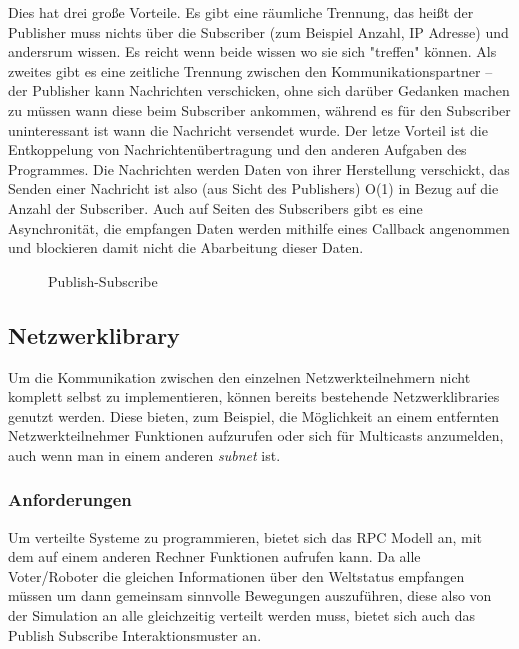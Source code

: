 Dies hat drei gro{\ss}e Vorteile. Es gibt eine r{\"{a}}umliche Trennung, das hei{\ss}t der Publisher muss
nichts {\"{u}}ber die Subscriber (zum Beispiel Anzahl, IP Adresse) und andersrum wissen. Es reicht
wenn beide wissen wo sie sich "treffen" k{\"{o}}nnen. Als zweites gibt es eine zeitliche Trennung zwischen
den Kommunikationspartner -- der Publisher kann Nachrichten verschicken, ohne sich dar{\"{u}}ber Gedanken
machen zu m{\"{u}}ssen wann diese beim Subscriber ankommen, w{\"{a}}hrend es f{\"{u}}r den Subscriber
uninteressant ist wann die Nachricht versendet wurde. Der letze Vorteil ist die Entkoppelung von
Nachrichten{\"{u}}bertragung und den anderen Aufgaben des Programmes. Die Nachrichten werden Daten
von ihrer Herstellung verschickt, das Senden einer Nachricht ist also (aus Sicht des
Publishers) O(1) in Bezug auf die Anzahl der Subscriber. Auch auf Seiten des Subscribers gibt es eine
Asynchronit{\"{a}}t, die empfangen Daten werden mithilfe eines Callback angenommen und blockieren damit
nicht die Abarbeitung dieser Daten.

\begin{figure}
	\centering
	\caption{Publish-Subscribe}
	\label{fig:pubsub}
\end{figure}

\subsection{Netzwerklibrary}
Um die Kommunikation zwischen den einzelnen Netzwerkteilnehmern nicht komplett selbst zu implementieren, k{\"{o}}nnen bereits bestehende Netzwerklibraries genutzt werden.
Diese bieten, zum Beispiel, die M{\"{o}}glichkeit an einem entfernten Netzwerkteilnehmer Funktionen aufzurufen oder sich f{\"{u}}r Multicasts anzumelden, auch wenn man in einem anderen
\textit{subnet} ist.

\subsubsection{Anforderungen}
Um verteilte Systeme zu programmieren, bietet sich das RPC Modell an, mit dem auf einem anderen Rechner Funktionen 
aufrufen kann. Da alle Voter/Roboter die gleichen Informationen {\"{u}}ber den Weltstatus empfangen m{\"{u}}ssen um
dann gemeinsam sinnvolle Bewegungen auszuf{\"{u}}hren, diese also von der Simulation an alle gleichzeitig verteilt werden
muss, bietet sich auch das Publish Subscribe Interaktionsmuster an.

